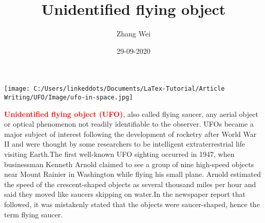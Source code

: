 \documentclass[12pt,onecolumn]{article}
\title{Unidentified flying object}
\author{Zhang Wei}
\date{29-09-2020}
\begin{document}
\maketitle

\thispagestyle{empty}

\texttt{[image: C:/Users/linkeddots/Documents/LaTex-Tutorial/Article Writing/UFO/Image/ufo-in-space.jpg]}

\begin{center}
\textcolor{red}{\textbf{Unidentified flying object (UFO)}}, also called flying saucer, any aerial object or optical phenomenon not readily identifiable to the observer. UFOs became a major subject of interest following the development of rocketry after World War II and were thought by some researchers to be intelligent extraterrestrial life visiting Earth.The first well-known UFO sighting occurred in 1947, when businessman Kenneth Arnold claimed to see a group of nine high-speed objects near Mount Rainier in Washington while flying his small plane. Arnold estimated the speed of the crescent-shaped objects as several thousand miles per hour and said they moved like saucers skipping on water.In the newspaper report that followed, it was mistakenly stated that the objects were saucer-shaped, hence the term flying saucer.
\end{center}
\end{document}
